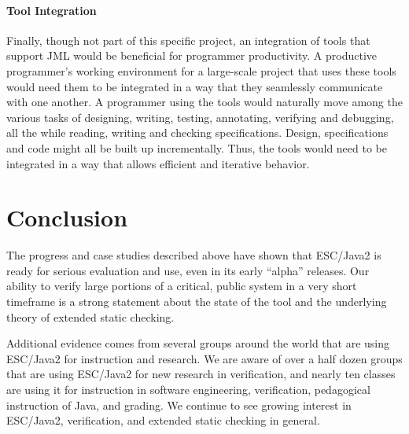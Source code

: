 \documentclass{llncs}
\begin{document}
\paragraph*{Tool Integration} Finally, though not part of this specific
project, an integration of tools that support JML would be beneficial
for programmer productivity.  A productive programmer's working
environment for a large-scale project that uses these tools would need
them to be integrated in a way that they seamlessly communicate
with one another.  A programmer using the tools would naturally move
among the various tasks of designing, writing, testing, annotating,
verifying and debugging, all the while reading, writing and checking
specifications.  Design, specifications and code might all be built up
incrementally.  Thus, the tools would need to be integrated in a way
that allows efficient and iterative behavior.

\section{Conclusion}


The progress and case studies described above
have shown that ESC/Java2 is ready for serious
evaluation and use, even in its early ``alpha'' releases.  Our ability
to verify large portions of a critical, public system in a very short
timeframe is a strong statement about the state of the tool and the underlying
theory of extended static checking.  

Additional evidence comes from several groups around the world that are using
ESC/Java2 for instruction and research.  We are aware of over a half dozen
groups that are using ESC/Java2 for new research in verification, and
nearly ten classes are using it for instruction in software
engineering, verification, pedagogical instruction of Java, and
grading.  We continue to see growing interest in ESC/Java2, verification,
and extended static checking in general.
\end{document}
